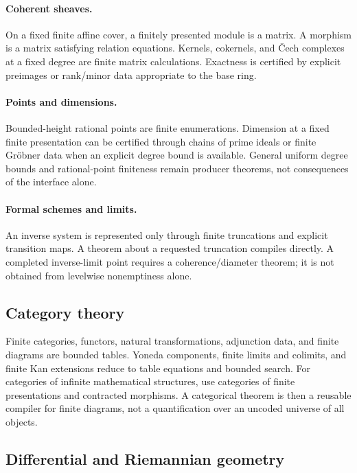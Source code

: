 \paragraph{Coherent sheaves.}
On a fixed finite affine cover, a finitely presented module is a matrix.  A
morphism is a matrix satisfying relation equations.  Kernels, cokernels, and
\v{C}ech complexes at a fixed degree are finite matrix calculations.  Exactness
is certified by explicit preimages or rank/minor data appropriate to the base
ring.

\paragraph{Points and dimensions.}
Bounded-height rational points are finite enumerations.  Dimension at a fixed
finite presentation can be certified through chains of prime ideals or finite
Gröbner data when an explicit degree bound is available.  General uniform
degree bounds and rational-point finiteness remain producer theorems, not
consequences of the interface alone.

\paragraph{Formal schemes and limits.}
An inverse system is represented only through finite truncations and explicit
transition maps.  A theorem about a requested truncation compiles directly.
A completed inverse-limit point requires a coherence/diameter theorem; it is
not obtained from levelwise nonemptiness alone.

\subsection{Category theory}

Finite categories, functors, natural transformations, adjunction data, and
finite diagrams are bounded tables.  Yoneda components, finite limits and
colimits, and finite Kan extensions reduce to table equations and bounded
search.  For categories of infinite mathematical structures, use categories
of finite presentations and contracted morphisms.  A categorical theorem is
then a reusable compiler for finite diagrams, not a quantification over an
uncoded universe of all objects.

\subsection{Differential and Riemannian geometry}


